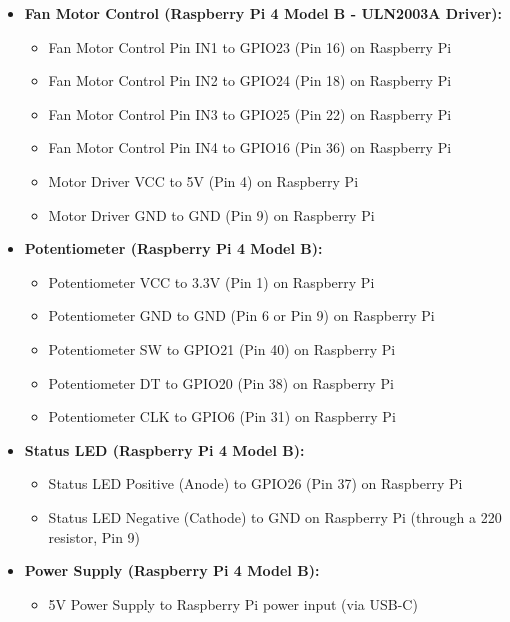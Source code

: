\begin{itemize}
    \item \textbf{Fan Motor Control (Raspberry Pi 4 Model B - ULN2003A Driver):}
    \begin{itemize}
        \item Fan Motor Control Pin IN1 to GPIO23 (Pin 16) on Raspberry Pi
        \item Fan Motor Control Pin IN2 to GPIO24 (Pin 18) on Raspberry Pi
        \item Fan Motor Control Pin IN3 to GPIO25 (Pin 22) on Raspberry Pi
        \item Fan Motor Control Pin IN4 to GPIO16 (Pin 36) on Raspberry Pi
        \item Motor Driver VCC to 5V (Pin 4) on Raspberry Pi
        \item Motor Driver GND to GND (Pin 9) on Raspberry Pi
    \end{itemize}

    \item \textbf{Potentiometer (Raspberry Pi 4 Model B):}
    \begin{itemize}
        \item Potentiometer VCC to 3.3V (Pin 1) on Raspberry Pi
        \item Potentiometer GND to GND (Pin 6 or Pin 9) on Raspberry Pi
        \item Potentiometer SW to GPIO21 (Pin 40) on Raspberry Pi
        \item Potentiometer DT to GPIO20 (Pin 38) on Raspberry Pi
        \item Potentiometer CLK to GPIO6 (Pin 31) on Raspberry Pi
    \end{itemize}

    \item \textbf{Status LED (Raspberry Pi 4 Model B):}
    \begin{itemize}
        \item Status LED Positive (Anode) to GPIO26 (Pin 37) on Raspberry Pi
        \item Status LED Negative (Cathode) to GND on Raspberry Pi (through a 220 \ohm{} resistor, Pin 9)
    \end{itemize}

    \item \textbf{Power Supply (Raspberry Pi 4 Model B):}
    \begin{itemize}
        \item 5V Power Supply to Raspberry Pi power input (via USB-C)
    \end{itemize}
\end{itemize}



